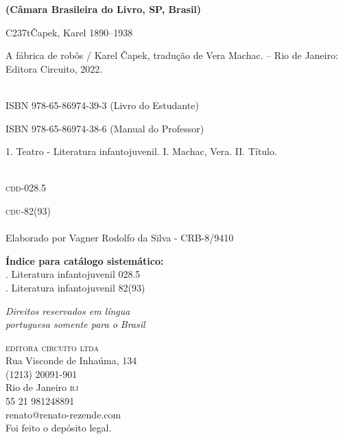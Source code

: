 \noindent\textbf{(Câmara Brasileira do Livro, SP, Brasil)}

\hrulefill

C237t\hspace{5pt}Čapek, Karel 1890--1938

\hspace{20pt}\parbox{190pt}{A fábrica de robôs / Karel Čapek, tradução de Vera Machac. -- Rio de Janeiro: Editora Circuito, 2022.}\\[6pt]

\hspace{20pt}ISBN 978-65-86974-39-3  (Livro do Estudante)

\hspace{20pt}ISBN 978-65-86974-38-6  (Manual do Professor)\\[6pt]

\hspace{20pt}\parbox{190pt}{1. Teatro - Literatura infantojuvenil. I. Machac, Vera. II. Título.}\\[6pt]

\hspace{188pt}\textsc{cdd}-028.5

\hspace{188pt}\textsc{cdu}-82(93)\\

\hrulefill\\
\noindent{}Elaborado por Vagner Rodolfo da Silva - CRB-8/9410

\qquad \textbf{Índice para catálogo sistemático:}\\
\mbox{}. Literatura infantojuvenil 028.5\\
\mbox{}. Literatura infantojuvenil 82(93)

\vfill

\textit{Direitos reservados em língua\\ 
portuguesa somente para o Brasil}\\\smallskip

\textsc{editora circuito ltda}\\
Rua Visconde de Inhaúma, 134\\
(1213) 20091-901\\
Rio de Janeiro \textsc{rj}\\
55 21 981248891\\
renato@renato-rezende.com\\
\bigskip
Foi feito o depósito legal.

\endgroup
\pagebreak